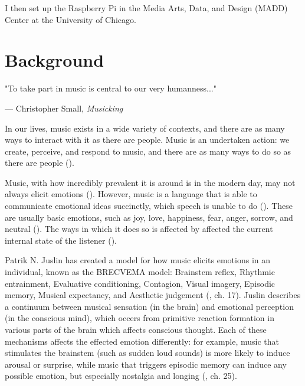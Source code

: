 \documentclass{article}
\renewcommand{\_}[1]{\underline{ #1 }}
\theoremstyle{definition}
\begin{document}
I then set up the Raspberry Pi in the Media Arts, Data, and Design (MADD) Center at the University of Chicago. 


\section{Background}

\begin{flushright}
    "To take part in music is central to our very humanness..."

    --- Christopher Small, \textit{Musicking}
\end{flushright}

In our lives, music exists in a wide variety of contexts, and there are as many ways to interact with it as there are people. Music is an undertaken action: we create, perceive, and respond to music, and there are as many ways to do so as there are people (\cite{small1998}). 

Music, with how incredibly prevalent it is around is in the modern day, may not always elicit emotions (\cite{juslin2019}). However, music is a language that is able to communicate emotional ideas succinctly, which speech is unable to do (\cite{henson1977}). These are usually basic emotions, such as joy, love, happiness, fear, anger, sorrow, and neutral (\cite{sundberg1983}). The ways in which it does so is affected by affected the current internal state of the listener (\cite{harrer1977}). 

Patrik N. Juslin has created a model for how music elicits emotions in an individual, known as the BRECVEMA model: Brainstem reflex, Rhythmic entrainment, Evaluative conditioning, Contagion, Visual imagery, Episodic memory, Musical expectancy, and Aesthetic judgement (\cite{juslin2019}, ch. 17). Juslin describes a continuum between musical sensation (in the brain) and emotional perception (in the conscious mind), which occers from primitive reaction formation in various parts of the brain which affects conscious thought. Each of these mechanisms affects the effected emotion differently: for example, music that stimulates the brainstem (such as sudden loud sounds) is more likely to induce arousal or surprise, while music that triggers episodic memory can induce any possible emotion, but especially nostalgia and longing (\cite{juslin2019}, ch. 25).
\end{document}
